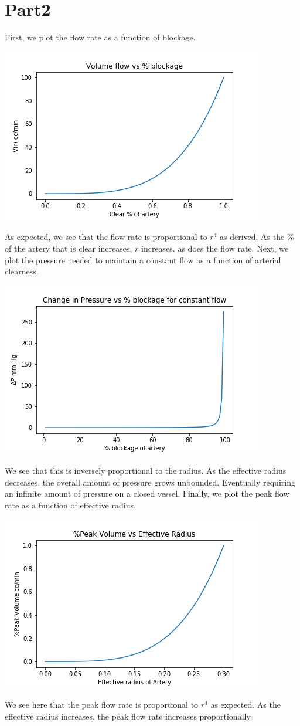 \documentclass[letterpaper,10pt]{article}
\begin{document}
\section*{Part2}
First, we plot the flow rate as a function of blockage.
\begin{center}
\includegraphics[scale=1]{flowvblock.png}
\end{center}
As expected, we see that the flow rate is proportional to $r^4$ as derived. As the \% of the artery that is clear increases, $r$ increases, as does the flow rate. Next, we plot the pressure needed to maintain a constant flow as a function of arterial clearness.
\begin{center}
\includegraphics[scale=1]{pressureblock.png}
\end{center}
We see that this is inversely proportional to the radius. As the effective radius decreases, the overall amount of pressure grows unbounded. Eventually requiring an infinite amount of pressure on a closed vessel. Finally, we plot the peak flow rate as a function of effective radius.
\begin{center}
\includegraphics[scale=1]{percentpeak.png}
\end{center}
We see here that the peak flow rate is proportional to $r^4$ as expected. As the effective radius increases, the peak flow rate increases proportionally.
\end{document}
